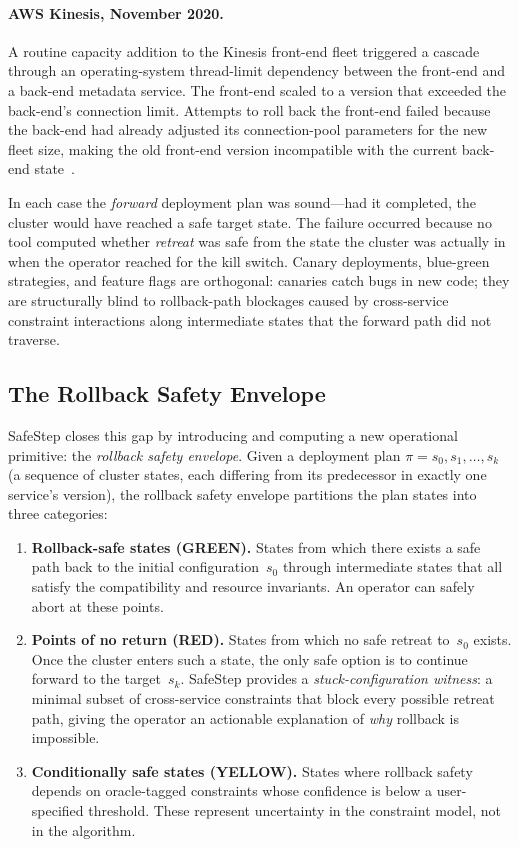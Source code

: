 \documentclass[10pt,twocolumn]{article}
\begin{document}
\paragraph{AWS Kinesis, November 2020.}
A routine capacity addition to the Kinesis front-end fleet triggered a
cascade through an operating-system thread-limit dependency between the
front-end and a back-end metadata service.  The front-end scaled to a
version that exceeded the back-end's connection limit.  Attempts to roll
back the front-end failed because the back-end had already adjusted its
connection-pool parameters for the new fleet size, making the old
front-end version incompatible with the current back-end
state~\cite{aws-kinesis-2020}.

\medskip
\noindent
In each case the \emph{forward} deployment plan was sound---had it
completed, the cluster would have reached a safe target state.  The
failure occurred because no tool computed whether \emph{retreat} was safe
from the state the cluster was actually in when the operator reached for
the kill switch.  Canary deployments, blue-green strategies, and feature
flags are orthogonal: canaries catch bugs in new code; they are
structurally blind to rollback-path blockages caused by cross-service
constraint interactions along intermediate states that the forward path did
not traverse.

\subsection{The Rollback Safety Envelope}
\label{sec:intro:envelope}

SafeStep closes this gap by introducing and computing a new operational
primitive: the \emph{rollback safety envelope}.  Given a deployment plan
$\pi = s_0, s_1, \ldots, s_k$ (a sequence of cluster states, each
differing from its predecessor in exactly one service's version), the
rollback safety envelope partitions the plan states into three categories:

\begin{enumerate}
\item \textbf{Rollback-safe states (GREEN).}  States from which there
  exists a safe path back to the initial configuration~$s_0$ through
  intermediate states that all satisfy the compatibility and resource
  invariants.  An operator can safely abort at these points.

\item \textbf{Points of no return (RED).}  States from which no safe
  retreat to~$s_0$ exists.  Once the cluster enters such a state, the only
  safe option is to continue forward to the target~$s_k$.  SafeStep
  provides a \emph{stuck-configuration witness}: a minimal subset of
  cross-service constraints that block every possible retreat path, giving
  the operator an actionable explanation of \emph{why} rollback is
  impossible.

\item \textbf{Conditionally safe states (YELLOW).}  States where rollback
  safety depends on oracle-tagged constraints whose confidence is below a
  user-specified threshold.  These represent uncertainty in the constraint
  model, not in the algorithm.
\end{enumerate}
\end{document}
